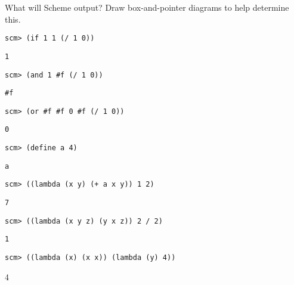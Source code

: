 \begin{blocksection}
\question What will Scheme output? Draw box-and-pointer diagrams to help determine this.

\begin{lstlisting}
scm> (if 1 1 (/ 1 0))
\end{lstlisting}
\begin{solution}[0.25in]
\begin{lstlisting}
1
\end{lstlisting}
\end{solution}

\begin{lstlisting}
scm> (and 1 #f (/ 1 0))
\end{lstlisting}
\begin{solution}[0.25in]
\begin{lstlisting}
#f
\end{lstlisting}
\end{solution}

\begin{lstlisting}
scm> (or #f #f 0 #f (/ 1 0))
\end{lstlisting}
\begin{solution}[0.25in]
\begin{lstlisting}
0
\end{lstlisting}
\end{solution}

\begin{lstlisting}
scm> (define a 4)
\end{lstlisting}
\begin{solution}[0.25in]
\begin{lstlisting}
a
\end{lstlisting}
\end{solution}

\begin{lstlisting}
scm> ((lambda (x y) (+ a x y)) 1 2)
\end{lstlisting}
\begin{solution}[0.25in]
\begin{lstlisting}
7
\end{lstlisting}
\end{solution}

\begin{lstlisting}
scm> ((lambda (x y z) (y x z)) 2 / 2)
\end{lstlisting}
\begin{solution}[0.25in]
\begin{lstlisting}
1
\end{lstlisting}
\end{solution}

\begin{lstlisting}
scm> ((lambda (x) (x x)) (lambda (y) 4))
\end{lstlisting}
\begin{solution}[0.25in]
4
\end{solution}
\end{blocksection}

